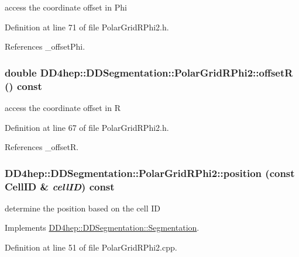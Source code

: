 access the coordinate offset in Phi 

Definition at line 71 of file PolarGridRPhi2.h.

References \_\-offsetPhi.\hypertarget{class_d_d4hep_1_1_d_d_segmentation_1_1_polar_grid_r_phi2_a7df4f48eab7247dc4b8f0b1fc1b464d8}{
\subsubsection[{offsetR}]{\setlength{\rightskip}{0pt plus 5cm}double DD4hep::DDSegmentation::PolarGridRPhi2::offsetR () const}}
\label{class_d_d4hep_1_1_d_d_segmentation_1_1_polar_grid_r_phi2_a7df4f48eab7247dc4b8f0b1fc1b464d8}


access the coordinate offset in R 

Definition at line 67 of file PolarGridRPhi2.h.

References \_\-offsetR.\hypertarget{class_d_d4hep_1_1_d_d_segmentation_1_1_polar_grid_r_phi2_a5a61e856d814397d2be8046585266863}{
\subsubsection[{position}]{ DD4hep::DDSegmentation::PolarGridRPhi2::position (const {\bf CellID} \& {\em cellID}) const}}
\label{class_d_d4hep_1_1_d_d_segmentation_1_1_polar_grid_r_phi2_a5a61e856d814397d2be8046585266863}


determine the position based on the cell ID 

Implements \hyperlink{class_d_d4hep_1_1_d_d_segmentation_1_1_segmentation_a594fe6d78667415855858d083b64acad}{DD4hep::DDSegmentation::Segmentation}.

Definition at line 51 of file PolarGridRPhi2.cpp.

